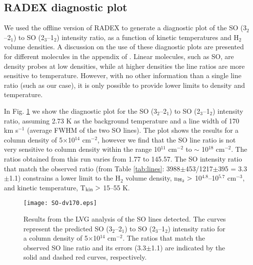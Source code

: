 \documentclass[a4paper,fleqn,usenatbib]{mnras}
\begin{document}
\newpage
\begin{appendix}

\section{RADEX diagnostic plot}

We used the offline version of RADEX \citep{Tak07} to generate a diagnostic plot of the SO (3$_2$--2$_1$) to SO (2$_3$--1$_2$) intensity ratio, as a function of kinetic temperatures and H$_2$ volume densities. A discussion on the use of these diagnostic plots are presented for different molecules in the appendix of \citet{Tak07}. Linear molecules, such as SO, are density probes at low densities, while at higher densities the line ratios are more sensitive to temperature. However, with no other information than a single line ratio (such as our case), it is only possible to provide lower limits to density and temperature.  

In Fig. \ref{SO-LVG} we show the diagnostic plot for the SO (3$_2$--2$_1$) to SO (2$_3$--1$_2$) intensity ratio, assuming 2.73 K as the background temperature and a line width of 170 km s$^{-1}$ (average FWHM of the two SO lines). The plot shows the results for a column density of 5$\times$10$^{14}$ cm$^{-2}$, however we find that the SO line ratio is not very sensitive to column density within the range 10$^{11}$ cm$^{-2}$ to $\sim$ 10$^{18}$ cm$^{-2}$. The ratios obtained from this run varies from 1.77 to 145.57. The SO intensity ratio that match the observed ratio (from Table \ref{tab:lines}: 3988$\pm$453/1217$\pm$395 = 3.3$\pm$1.1) constrains a lower limit to the H$_2$ volume density, n$_{\rm H_2} >$ 10$^{4.8}$--10$^{5.7}$ cm$^{-3}$, and kinetic temperature, T$_{\rm kin} >$ 15--55 K. 

\begin{figure}
\centering
\texttt{[image: SO-dv170.eps]}
\caption{Results from the LVG analysis of the SO lines detected. The curves represent the predicted SO (3$_2$--2$_1$) to SO (2$_3$--1$_2$) intensity ratio for a column density of 5$\times$10$^{14}$ cm$^{-2}$. The ratios that match the observed SO line ratio and its errors (3.3$\pm$1.1) are indicated by the solid and dashed red curves, respectively.}
\label{SO-LVG}
\end{figure}

\end{appendix}

\bsp	%
\label{lastpage}
\end{document}
